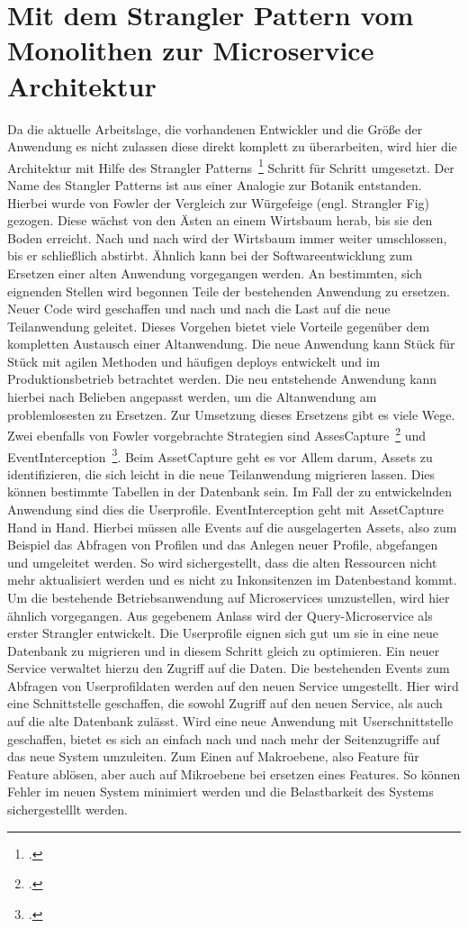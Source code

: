 \section{Mit dem Strangler Pattern vom Monolithen zur Microservice Architektur}
Da die aktuelle Arbeitslage, die vorhandenen Entwickler und die Größe der Anwendung es nicht zulassen diese direkt komplett zu überarbeiten, wird hier die Architektur mit Hilfe des Strangler Patterns~\footcite[][]{Fowler:Strangler} Schritt für Schritt umgesetzt.
Der Name des Stangler Patterns ist aus einer Analogie zur Botanik entstanden. Hierbei wurde von Fowler der Vergleich zur Würgefeige (engl. Strangler Fig) gezogen. Diese wächst von den Ästen an einem Wirtsbaum herab, bis sie den Boden erreicht. Nach und nach wird der Wirtsbaum immer weiter umschlossen, bis er schließlich abstirbt.
Ähnlich kann bei der Softwareentwicklung zum Ersetzen einer alten Anwendung vorgegangen werden. An bestimmten, sich eignenden Stellen wird begonnen Teile der bestehenden Anwendung zu ersetzen. Neuer Code wird geschaffen und nach und nach die Last auf die neue Teilanwendung geleitet.
Dieses Vorgehen bietet viele Vorteile gegenüber dem kompletten Austausch einer Altanwendung. Die neue Anwendung kann Stück für Stück mit agilen Methoden und häufigen deploys entwickelt und im Produktionsbetrieb betrachtet werden. Die neu entstehende Anwendung kann hierbei nach Belieben angepasst werden, um die Altanwendung am problemlosesten zu Ersetzen.
Zur Umsetzung dieses Ersetzens gibt es viele Wege. Zwei ebenfalls von Fowler vorgebrachte Strategien sind AssesCapture~\footcite[][]{Fowler:Capture} und EventInterception~\footcite[][]{Fowler:Interception}.
Beim AssetCapture geht es vor Allem darum, Assets zu identifizieren, die sich leicht in die neue Teilanwendung migrieren lassen. Dies können bestimmte Tabellen in der Datenbank sein. Im Fall der zu entwickelnden Anwendung sind dies die Userprofile.
EventInterception geht mit AssetCapture Hand in Hand. Hierbei müssen alle Events auf die ausgelagerten Assets, also zum Beispiel das Abfragen von Profilen und das Anlegen neuer Profile, abgefangen und umgeleitet werden.
So wird sichergestellt, dass die alten Ressourcen nicht mehr aktualisiert werden und es nicht zu Inkonsitenzen im Datenbestand kommt.
Um die bestehende Betriebsanwendung auf Microservices umzustellen, wird hier ähnlich vorgegangen. Aus gegebenem Anlass wird der Query-Microservice als erster Strangler entwickelt. Die Userprofile eignen sich gut um sie in eine neue Datenbank zu migrieren und in diesem Schritt gleich zu optimieren. Ein neuer Service verwaltet hierzu den Zugriff auf die Daten. Die bestehenden Events zum Abfragen von Userprofildaten werden auf den neuen Service umgestellt. Hier wird eine Schnittstelle geschaffen, die sowohl Zugriff auf den neuen Service, als auch auf die alte Datenbank zulässt. Wird eine neue Anwendung mit Userschnittstelle geschaffen, bietet es sich an einfach nach und nach mehr der Seitenzugriffe auf das neue System umzuleiten. Zum Einen auf Makroebene, also Feature für Feature ablösen, aber auch auf Mikroebene bei ersetzen eines Features. So können Fehler im neuen System minimiert werden und die Belastbarkeit des Systems sichergestelllt werden.
